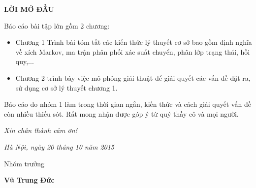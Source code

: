 
\author{Nguyễn Thanh Tuyền}
\centerline{\bf \large\MakeUppercase{Lời mở đầu}}
\vspace{20pt}
Báo cáo bài tập lớn gồm 2 chương:
\begin{itemize}
\item  Chương 1 Trình bài tóm tắt các kiến thức lý thuyết cơ sở bao gồm định nghĩa về xích Markov, ma trận phân phối xác suất chuyển, phân lớp trạng thái, hồi quy,...
\item  Chương 2 trình bày việc mô phỏng giải thuật để giải quyết các vấn đề đặt ra, sử dụng cơ sở lý thuyết chương 1. 
\end{itemize}
Báo cáo do nhóm 1 làm trong thời gian ngắn, kiến thức và cách giải quyết vấn đề còn nhiều thiếu sót. Rất mong nhận được góp ý từ quý thầy cô và mọi người.

\textrm{\textit{Xin chân thành cảm ơn!}}
  \begin{flushright}
{\it Hà Nội, ngày 20 tháng 10 năm 2015}

 Nhóm trưởng \hskip 2cm\quad

\vskip 2cm
{\bf Vũ Trung Đức} \hskip 1cm \quad\ 
 \end{flushright}